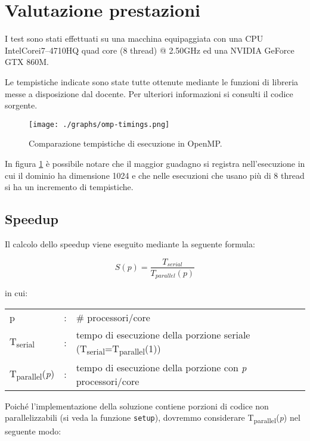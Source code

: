 \section{Valutazione prestazioni}

I test sono stati effettuati su una macchina equipaggiata con una CPU
Intel\textregistered\@ Core\texttrademark\@ i7--4710HQ quad core (8 thread) @
2.50GHz ed una NVIDIA GeForce GTX 860M.


Le tempistiche indicate sono state tutte ottenute mediante le funzioni di
libreria messe a disposizione dal docente. Per ulteriori informazioni si
consulti il codice sorgente.

\begin{figure}[!ht]
  \centering
  \texttt{[image: ./graphs/omp-timings.png]}
  \caption{Comparazione tempistiche di esecuzione in OpenMP.}\label{fig:timings1}
\end{figure}

In figura \ref{fig:timings1} è possibile notare che il maggior guadagno si
registra nell'esecuzione in cui il dominio ha dimensione 1024 e che nelle
esecuzioni che usano più di 8 thread si ha un incremento di tempistiche.

\subsection{Speedup}

Il calcolo dello speedup viene eseguito mediante la seguente formula:

\[ 
    S(p) = \frac{T_{serial}}{T_{parallel}(p)}
\]

in cui:
\begin{table}[ht]
\begin{tabular}{lll}
    p & : & \# processori/core\\
    T\textsubscript{serial}& : & tempo di esecuzione della porzione seriale
    (T\textsubscript{serial}=T\textsubscript{parallel}(1))\\
    T\textsubscript{parallel}(\textit{p}) & : & tempo di esecuzione della porzione con
    \textit{p} processori/core
\end{tabular}
\end{table}

Poiché l'implementazione della soluzione contiene porzioni di codice non
parallelizzabili (si veda la funzione \texttt{setup}), dovremmo considerare
T\textsubscript{parallel}(\textit{p}) nel seguente modo:

